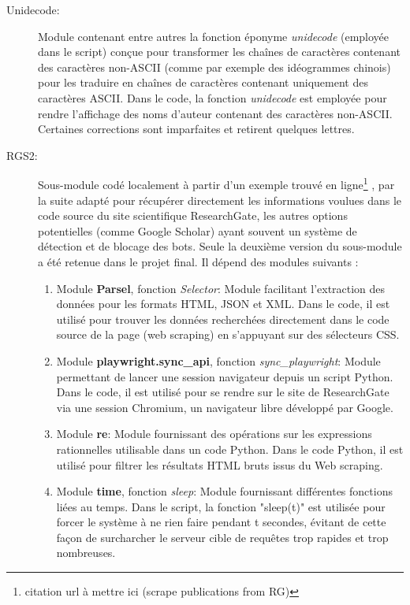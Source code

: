 \documentclass{book}
\begin{document}
\begin{description}
    \item[Unidecode:] Module contenant entre autres la fonction éponyme
        \textit{unidecode} (employée dans le script) conçue pour transformer les chaînes de
        caractères contenant des caractères non-ASCII (comme par exemple des
        idéogrammes chinois) pour les traduire en chaînes de caractères contenant
        uniquement des caractères ASCII. Dans le code, la fonction \textit{unidecode}
        est employée pour rendre l'affichage des noms d'auteur contenant des caractères
        non-ASCII. Certaines corrections sont imparfaites et retirent quelques lettres.

    \item[RGS2:] Sous-module codé localement à partir d'un exemple trouvé en
        ligne\footnote{citation url à mettre ici (scrape publications from RG)}
        , par la suite adapté pour récupérer directement les informations
        voulues dans le code source du site scientifique ResearchGate, les autres
        options potentielles (comme Google Scholar) ayant souvent un système de
        détection et de blocage des bots. Seule la deuxième version du sous-module a
        été retenue dans le projet final. Il dépend des modules suivants :
        
    \begin{enumerate}
        \item Module \textbf{Parsel}, fonction \textit{Selector}: Module
                facilitant l'extraction des données pour les formats HTML, JSON et XML. Dans le
                code, il est utilisé pour trouver les données recherchées directement dans le
                code source de la page (web scraping) en s'appuyant sur des sélecteurs CSS.
        \item Module \textbf{playwright.sync\_api}, fonction
                \textit{sync\_playwright}: Module permettant de lancer une session navigateur
                depuis un script Python. Dans le code, il est utilisé pour se rendre sur le
                site de ResearchGate via une session Chromium, un navigateur libre développé
                par Google.
        \item Module \textbf{re}: Module fournissant des opérations sur les
                expressions rationnelles utilisable dans un code Python. Dans le code Python, il est utilisé pour
                filtrer les résultats HTML bruts issus du Web scraping.
        \item Module \textbf{time}, fonction \textit{sleep}: Module
                fournissant différentes fonctions liées au temps. Dans le script, la fonction
                "sleep(t)" est utilisée pour forcer le système à ne rien faire pendant t
                secondes, évitant de cette façon de surcharcher le serveur cible de requêtes
                trop rapides et trop nombreuses.
    \end{enumerate}
\end{description}
\end{document}
